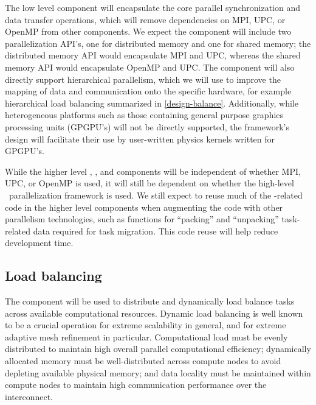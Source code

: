 \documentclass[10pt]{article}
\begin{document}
The low level  component will encapsulate the core
parallel synchronization and data transfer operations, which will
remove dependencies on MPI, UPC, or OpenMP from other components.  We
expect the  component will include two parallelization
API's, one for distributed memory and one for shared memory; the
distributed memory API would encapsulate MPI and UPC, whereas the
shared memory API would encapsulate OpenMP and UPC.  The
 component will also directly support hierarchical
parallelism, which we will use to improve the mapping of data and
communication onto the specific hardware, for example hierarchical
load balancing summarized in \ref{design-balance}.  Additionally,
while heterogeneous platforms such as those containing general purpose
graphics processing units (GPGPU's) will not be directly supported,
the framework's design will facilitate their use by user-written
physics kernels written for GPGPU's.

While the higher level , , and
 components will be independent of whether MPI, UPC,
or OpenMP is used, it will still be dependent on whether the
high-level \charm\ parallelization framework is used.  We still expect
to reuse much of the \charm-related code in the higher level
components when augmenting the code with other parallelism
technologies, such as functions for ``packing'' and ``unpacking''
task-related data required for task migration.  This code reuse will
help reduce development time.

\subsection{Load balancing} \label{ss:design-balance}

The  component will be used to distribute and
dynamically load balance tasks across available computational
resources.  Dynamic load balancing is well known to be a crucial
operation for extreme scalability in general, and for extreme adaptive
mesh refinement in particular.  Computational load must be evenly
distributed to maintain high overall parallel computational
efficiency; dynamically allocated memory must be well-distributed
across compute nodes to avoid depleting available physical memory; and
data locality must be maintained within compute nodes to maintain high
communication performance over the interconnect.
\end{document}
